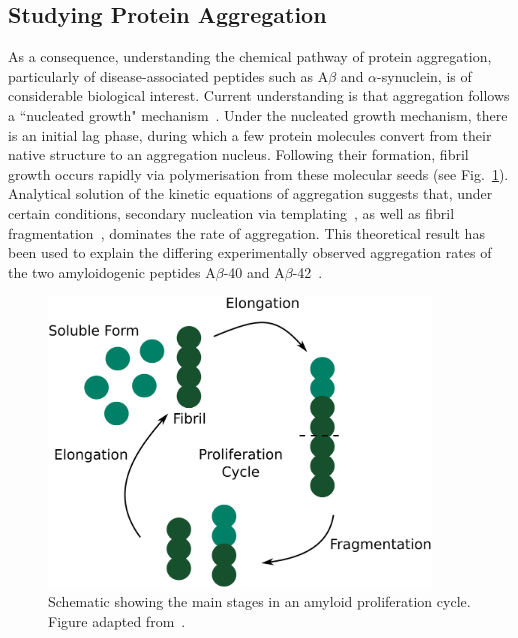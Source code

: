 \subsection{Studying Protein Aggregation}
\label{subect:aggregation}
As a consequence, understanding the chemical pathway of protein aggregation, particularly of disease-associated peptides such as A${\beta}$ and $\alpha$-synuclein, is of considerable biological interest. Current understanding is that aggregation follows a ``nucleated growth" mechanism~\cite{chiti2006}. Under the nucleated growth mechanism, there is an initial lag phase, during which a few protein molecules convert from their native structure to an aggregation nucleus. Following their formation, fibril growth occurs rapidly via polymerisation from these molecular seeds (see Fig.~\ref{fig:aggregation_pathways}). Analytical solution of the kinetic equations of aggregation suggests that, under certain conditions, secondary nucleation via templating~\cite{knowles2009}, as well as fibril fragmentation~\cite{Knowles2011}, dominates the rate of aggregation. This theoretical result has been used to explain the differing experimentally observed aggregation rates of the two amyloidogenic peptides A$\beta$-40 and A$\beta$-42~\cite{cohen2013, meisl2014}.

\begin{figure}
   \begin{center}
      \includegraphics*[clip=true, width=4in]{sizing/proliferation.pdf}
      \caption{Schematic showing the main stages in an amyloid proliferation cycle. Figure adapted from~\cite{knowles2009}.}
      \label{fig:aggregation_pathways}
   \end{center}
\end{figure}

